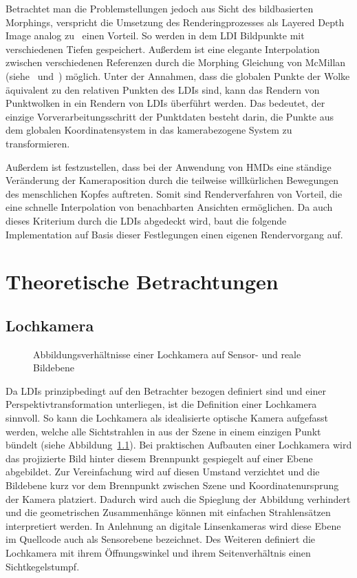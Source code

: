 \documentclass[hyperref, beleg, german, final, twoside]{cgvpub}
\begin{document}
Betrachtet man die Problemstellungen jedoch aus Sicht des bildbasierten
Morphings, verspricht die Umsetzung des Renderingprozesses als Layered Depth
Image analog zu~\cite{chang1999ldi} einen Vorteil. So werden in dem LDI
Bildpunkte mit verschiedenen Tiefen gespeichert. Außerdem ist eine elegante
Interpolation zwischen verschiedenen Referenzen durch die Morphing Gleichung
von McMillan (siehe~\cite{mcmillan1995list} und~\cite{mcmillan1995plenoptic})
möglich. Unter der Annahmen, dass die globalen Punkte der Wolke äquivalent zu
den relativen Punkten des LDIs sind, kann das Rendern von Punktwolken in ein
Rendern von LDIs überführt werden. Das bedeutet, der einzige
Vorverarbeitungsschritt der Punktdaten besteht darin, die Punkte aus dem
globalen Koordinatensystem in das kamerabezogene System zu transformieren.

Außerdem ist festzustellen, dass bei der Anwendung von HMDs eine ständige
Veränderung der Kameraposition durch die teilweise willkürlichen Bewegungen des
menschlichen Kopfes auftreten. Somit sind Renderverfahren von Vorteil, die eine
schnelle Interpolation von benachbarten Ansichten ermöglichen. Da auch dieses
Kriterium durch die LDIs abgedeckt wird, baut die folgende Implementation auf
Basis dieser Festlegungen einen eigenen Rendervorgang auf.

\chapter{Theoretische Betrachtungen}

\section{Lochkamera}

\begin{figure}
	\centering
	
	\caption{Abbildungsverhältnisse einer Lochkamera auf Sensor- und reale
		Bildebene}%
	\label{fig:pinholecamera}
\end{figure}

Da LDIs prinzipbedingt auf den Betrachter bezogen definiert sind und einer
Perspektivtransformation unterliegen, ist die Definition einer Lochkamera
sinnvoll. So kann die Lochkamera als idealisierte optische Kamera aufgefasst
werden, welche alle Sichtstrahlen in aus der Szene in einem einzigen Punkt
bündelt (siehe Abbildung~\ref{fig:pinholecamera}). Bei praktischen Aufbauten
einer Lochkamera wird das projizierte Bild hinter diesem Brennpunkt gespiegelt
auf einer Ebene abgebildet. Zur Vereinfachung wird auf diesen Umstand
verzichtet und die Bildebene kurz vor dem Brennpunkt zwischen Szene und
Koordinatenursprung der Kamera platziert. Dadurch wird auch die Spieglung der
Abbildung verhindert und die geometrischen Zusammenhänge können mit einfachen
Strahlensätzen interpretiert werden. In Anlehnung an digitale Linsenkameras
wird diese Ebene im Quellcode auch als Sensorebene bezeichnet. Des Weiteren
definiert die Lochkamera mit ihrem Öffnungswinkel und ihrem Seitenverhältnis
einen Sichtkegelstumpf.
\end{document}
